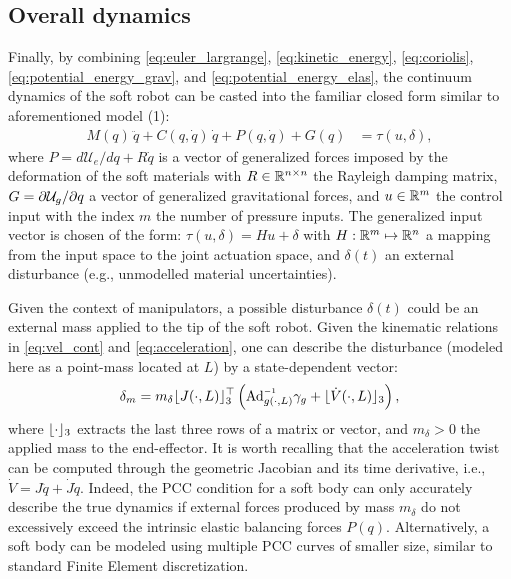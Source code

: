 {\subsection*{Overall dynamics}
\noindent Finally, by combining \eqref{eq:euler_largrange}, \eqref{eq:kinetic_energy}, \eqref{eq:coriolis}, \eqref{eq:potential_energy_grav}, and \eqref{eq:potential_energy_elas}, the continuum dynamics of the soft robot can be casted into the familiar closed form \cite{Santina2020Pcc,Boyer2021,Renda2018,Godage2016} similar to aforementioned model (1):
%
\begin{align}
M({q})\,\ddot{{q}} + {C}({q},\dot{{q}})\,\dot{{q}} + P({q},\dot{q}) + G({q}) & = \tau(u,\delta), \label{eq:dynamic_model}
\end{align}
%
\noindent where $P = d \mathcal{U}_e/d q + R\dot{q}$ is a vector of generalized forces imposed by the deformation of the soft materials with $R \in \mathbb{R}^{n\times n}$ the Rayleigh damping matrix, $G = \partial \mathcal{U}_g/\partial q$ a vector of generalized gravitational forces, and $u \in \mathbb{R}^m$ the control input with the index $m$ the number of pressure inputs. The generalized input vector is chosen of the form: $\tau(u,\delta) = H u + \delta$ with $H: \mathbb{R}^m \mapsto \mathbb{R}^n$ a mapping from the input space to the joint actuation space, and $\delta(t)$ an external disturbance (e.g., unmodelled material uncertainties).
%
\begin{rmk}
Given the context of manipulators, a possible disturbance $\delta(t)$ could be an external mass applied to the tip of the soft robot. Given the kinematic relations in \eqref{eq:vel_cont} and \eqref{eq:acceleration}, one can describe the disturbance (modeled here as a point-mass located at $L$) by a state-dependent vector:
%
\begin{equation}
\delta_m = m_\delta \floor{J(\cdot,L)}_3^\top\left({\normalfont \Ad}_{g(\cdot,L)}\inv\gamma_g + \floor{\dot{V}(\cdot,L)}_3 \right),
\label{eq:delta_payload}
\end{equation}
%
where $\lfloor\cdot\rfloor_3$ extracts the last three rows of a matrix or vector, and $m_\delta > 0$ the applied mass to the end-effector. It is worth recalling that the acceleration twist can be computed through the geometric Jacobian and its time derivative, i.e., $\dot{V} = J\ddot{q} + \dot{J}\dot{q}$. Indeed, the PCC condition for a soft body can only accurately describe the true dynamics if external forces produced by mass $m_\delta$ do not excessively exceed the intrinsic elastic balancing forces $P(q)$. Alternatively, a soft body can be modeled using multiple PCC curves of smaller size, similar to standard Finite Element discretization.
\end{rmk}

}
